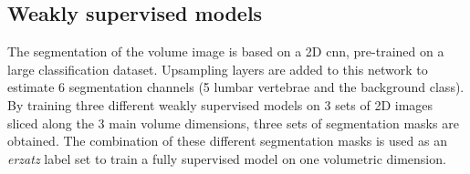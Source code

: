 \begin{multicols}{2}
\subsection*{Weakly supervised models}
\par{
    The segmentation of the volume image is based on a 2D \acrfull{cnn}, pre-trained on a large classification dataset.
    Upsampling layers are added to this network to estimate 6 segmentation channels (5 lumbar vertebrae and the background class). 
    By training three different weakly supervised models on 3 sets of 2D images sliced along the 3 main volume dimensions, three sets of segmentation masks are obtained. 
    The combination of these different segmentation masks is used as an \textit{erzatz} label set to train a fully supervised model on one volumetric dimension.
}


\end{multicols}
